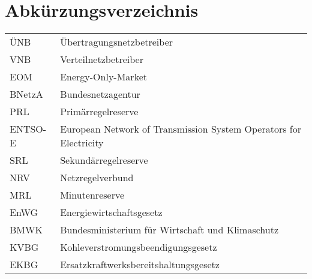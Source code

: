 \section*{Abkürzungsverzeichnis}
%
%	
	\begin{tabulary}{\textwidth}{lL}
		ÜNB & Übertragungsnetzbetreiber \\
		VNB & Verteilnetzbetreiber \\
		EOM & Energy-Only-Market \\
		BNetzA & Bundesnetzagentur \\
		PRL & Primärregelreserve \\
		ENTSO-E & European Network of Transmission System Operators for Electricity \\
		SRL & Sekundärregelreserve \\
		NRV & Netzregelverbund \\
		MRL & Minutenreserve \\
		EnWG & Energiewirtschaftsgesetz \\
		BMWK & Bundesministerium für Wirtschaft und Klimaschutz	\\
		KVBG & Kohleverstromungsbeendigungsgesetz \\
		EKBG & Ersatzkraftwerksbereitshaltungsgesetz \\
	\end{tabulary} \clearpage

	

